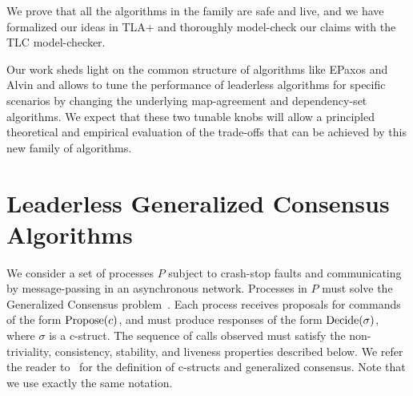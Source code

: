 We prove that all the algorithms in the family are safe and live, and we have formalized our ideas in TLA+ and thoroughly model-check our claims with the TLC model-checker.

Our work sheds light on the common structure of algorithms like EPaxos and Alvin and allows to tune the performance of leaderless algorithms for specific scenarios by changing the underlying map-agreement and dependency-set algorithms.
We expect that these two tunable knobs will allow a principled theoretical and empirical evaluation of the trade-offs that can be achieved by this new family of algorithms.

\section{Leaderless Generalized Consensus Algorithms}

We consider a set of processes $P$ subject to crash-stop faults and communicating by message-passing in an asynchronous network. Processes in $P$ must solve the Generalized Consensus problem~\cite{Lamport05GeneralizeConsensus}. Each process receives proposals for commands of the form $\operatorname{Propose}(c)$, and must produce responses of the form $\operatorname{Decide}(\sigma)$, where $\sigma$ is a c-struct. 
The sequence of calls observed must satisfy the non-triviality, consistency, stability, and liveness properties described below.
We refer the reader to~\cite{Lamport05GeneralizeConsensus} for the definition of c-structs and generalized consensus. Note that we use exactly the same notation.

